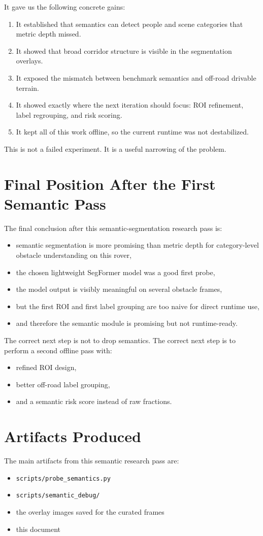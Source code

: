 \documentclass[11pt]{article}
\begin{document}
It gave us the following concrete gains:
\begin{enumerate}[leftmargin=*]
\item It established that semantics can detect people and scene categories that metric depth missed.
\item It showed that broad corridor structure is visible in the segmentation overlays.
\item It exposed the mismatch between benchmark semantics and off-road drivable terrain.
\item It showed exactly where the next iteration should focus: ROI refinement, label regrouping, and risk scoring.
\item It kept all of this work offline, so the current runtime was not destabilized.
\end{enumerate}

This is not a failed experiment. It is a useful narrowing of the problem.

\section{Final Position After the First Semantic Pass}
The final conclusion after this semantic-segmentation research pass is:
\begin{itemize}[leftmargin=*]
\item semantic segmentation is more promising than metric depth for category-level obstacle understanding on this rover,
\item the chosen lightweight SegFormer model was a good first probe,
\item the model output is visibly meaningful on several obstacle frames,
\item but the first ROI and first label grouping are too naive for direct runtime use,
\item and therefore the semantic module is promising but not runtime-ready.
\end{itemize}

The correct next step is not to drop semantics. The correct next step is to perform a second offline pass with:
\begin{itemize}[leftmargin=*]
\item refined ROI design,
\item better off-road label grouping,
\item and a semantic risk score instead of raw fractions.
\end{itemize}

\section{Artifacts Produced}
The main artifacts from this semantic research pass are:
\begin{itemize}[leftmargin=*]
\item \texttt{scripts/probe\_semantics.py}
\item \texttt{scripts/semantic\_debug/}
\item the overlay images saved for the curated frames
\item this document
\end{itemize}
\end{document}
